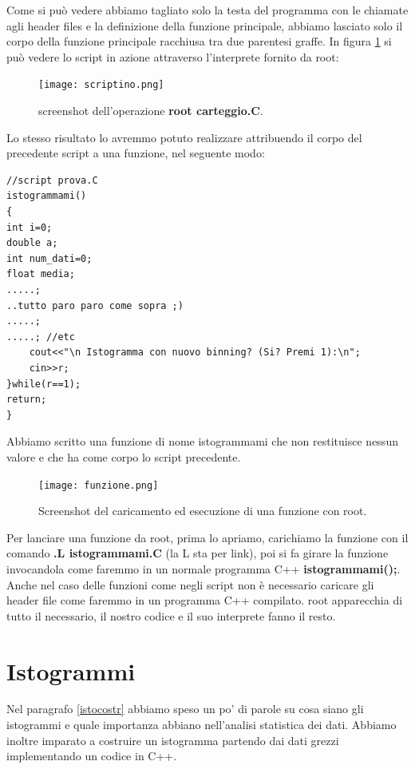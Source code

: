 \documentclass[11pt,fleqn]{book} %
\begin{document}
Come si può vedere abbiamo tagliato solo la testa del programma con le chiamate agli header files e la definizione della funzione principale, abbiamo lasciato solo il corpo della funzione principale racchiusa tra due parentesi graffe. In figura \ref{scriptino} si può vedere lo script in azione attraverso l'interprete fornito da root:
\begin{figure}[h]
\centering
\texttt{[image: scriptino.png]}
\caption{screenshot dell'operazione \textbf{root carteggio.C}.\label{scriptino}}
\end{figure}

Lo stesso risultato lo avremmo potuto realizzare attribuendo il corpo del precedente script a una funzione, nel seguente modo:

\begin{verbatim}
//script prova.C
istogrammami()
{
int i=0;
double a;
int num_dati=0;  				
float media;	
.....;
..tutto paro paro come sopra ;)
.....;
.....; //etc
	cout<<"\n Istogramma con nuovo binning? (Si? Premi 1):\n";
	cin>>r;
}while(r==1);
return;
}
\end{verbatim}

Abbiamo scritto una funzione di nome istogrammami che non restituisce nessun valore e che ha come corpo lo script precedente.
\begin{figure}[h]
\centering
\texttt{[image: funzione.png]}
\caption{ Screenshot del caricamento ed esecuzione di una funzione con root.\label{funzione}}
\end{figure}

Per lanciare una funzione da root, prima lo apriamo, carichiamo la funzione con il comando \textbf{.L istogrammami.C} (la L sta per link), poi si fa girare la funzione invocandola come faremmo in un normale programma C++ \textbf{istogrammami();}.
Anche nel caso delle funzioni come negli script non è necessario caricare gli header file come faremmo in un programma C++ compilato. root apparecchia di tutto il necessario, il nostro codice e il suo interprete fanno il resto.

\section{Istogrammi}
Nel paragrafo \ref{istocostr} abbiamo speso un po' di parole su cosa siano gli istogrammi e quale importanza abbiano nell'analisi statistica dei dati.
Abbiamo inoltre imparato a costruire un istogramma partendo dai dati grezzi implementando un codice in C++.
\end{document}
